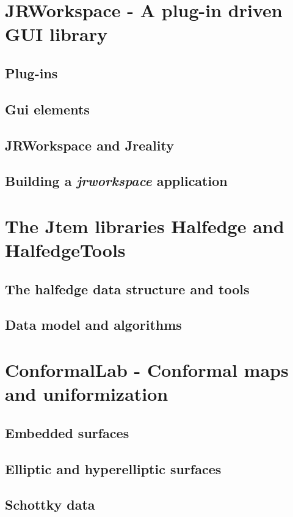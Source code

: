 \section{{\sc JRWorkspace} - A plug-in driven GUI library}

\label{sec:jrworkspace}
\subsection{Plug-ins}
\subsection{Gui elements}
\subsection{{\sc JRWorkspace} and {\sc Jreality}}
\subsection{Building a \emph{jrworkspace} application}

\section{The {\sc Jtem} libraries {\sc Halfedge} and {\sc HalfedgeTools}}
\subsection{The halfedge data structure and tools}
\subsection{Data model and algorithms}

\section{{\sc ConformalLab} - Conformal maps and uniformization}
\label{sec:conformallab}
\subsection{Embedded surfaces}
\subsection{Elliptic and hyperelliptic surfaces}
\subsection{Schottky data}
